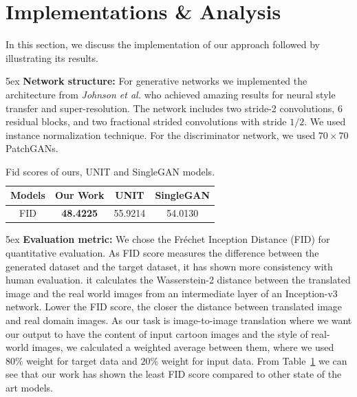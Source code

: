 \documentclass[conference]{IEEEtran}
\begin{document}
\section{Implementations \& Analysis} \label{sec:imp}
In this section, we discuss the implementation of our approach followed by illustrating its results.

\parindent 5ex \textbf{Network structure:}
For generative networks we implemented the architecture from \textit{Johnson et al.} \cite{DBLP:journals/corr/JohnsonAL16} who achieved amazing results for neural style transfer and super-resolution. The network includes two stride-2 convolutions, $6$ residual blocks\cite{DBLP:journals/corr/HeZRS15}, and two fractional strided convolutions with stride $1/2$. We used instance normalization technique. For the discriminator network, we used $70\times70$ PatchGANs\cite{DBLP:conf/cvpr/2017}.
 
\begin{table}[!htb]
\centering
\caption{Fid scores of ours, UNIT and SingleGAN models.}
\large\addtolength{\tabcolsep}{0pt}
\begin{tabular}{ |c|c|c|c| } 
 \hline
 Models & Our Work & UNIT & SingleGAN \\ 
 \hline
 FID & \textbf{48.4225} & 55.9214 & 54.0130 \\
 \hline  
\end{tabular}

\label{fid_table}
\end{table}
\parindent 5ex \textbf{Evaluation metric:}
We chose the Fr\'echet Inception Distance (FID) \cite{DBLP:journals/corr/HeuselRUNKH17} for quantitative evaluation. As FID score measures the difference between the generated dataset and the target dataset, it has shown more consistency with human evaluation. it calculates the Wasserstein-2 distance between the translated image and the real world images from an intermediate layer of an Inception-v3 network. Lower the FID score, the closer the distance between translated image and real domain images. As our task is image-to-image translation where we want our output to have the content of input cartoon images and the style of real-world images, we calculated a weighted average between them, where we used $80\%$ weight for target data and $20\%$ weight for input data. From Table~\ref{fid_table} we can see that our work has shown the least FID score compared to other state of the art models.
\end{document}
